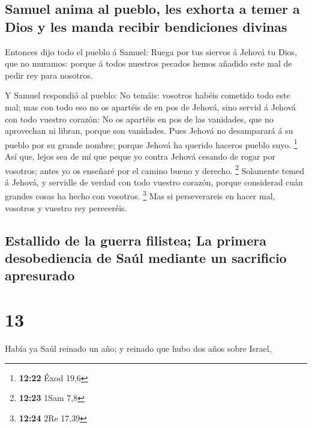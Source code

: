 \hypertarget{samuel-anima-al-pueblo-les-exhorta-a-temer-a-dios-y-les-manda-recibir-bendiciones-divinas}{%
\subsection{Samuel anima al pueblo, les exhorta a temer a Dios y les
manda recibir bendiciones
divinas}\label{samuel-anima-al-pueblo-les-exhorta-a-temer-a-dios-y-les-manda-recibir-bendiciones-divinas}}

 Entonces dijo todo el pueblo á Samuel: Ruega por tus
siervos á Jehová tu Dios, que no muramos: porque á todos nuestros
pecados hemos añadido este mal de pedir rey para nosotros.

 Y Samuel respondió al pueblo: No temáis: vosotros habéis
cometido todo este mal; mas con todo eso no os apartéis de en pos de
Jehová, sino servid á Jehová con todo vuestro corazón:  No
os apartéis en pos de las vanidades, que no aprovechan ni libran, porque
son vanidades.  Pues Jehová no desamparará á su pueblo por
su grande nombre; porque Jehová ha querido haceros pueblo suyo.
\footnote{\textbf{12:22} Éxod 19,6}  Así que, lejos sea de
mí que peque yo contra Jehová cesando de rogar por vosotros; antes yo os
enseñaré por el camino bueno y derecho. \footnote{\textbf{12:23} 1Sam
  7,8}  Solamente temed á Jehová, y servidle de verdad con
todo vuestro corazón, porque considerad cuán grandes cosas ha hecho con
vosotros. \footnote{\textbf{12:24} 2Re 17,39}  Mas si
perseverareis en hacer mal, vosotros y vuestro rey pereceréis.

\hypertarget{estallido-de-la-guerra-filistea-la-primera-desobediencia-de-sauxfal-mediante-un-sacrificio-apresurado}{%
\subsection{Estallido de la guerra filistea; La primera desobediencia de
Saúl mediante un sacrificio
apresurado}\label{estallido-de-la-guerra-filistea-la-primera-desobediencia-de-sauxfal-mediante-un-sacrificio-apresurado}}

\hypertarget{section-12}{%
\section{13}\label{section-12}}

 Había ya Saúl reinado un año; y reinado que hubo dos años
sobre Israel,

